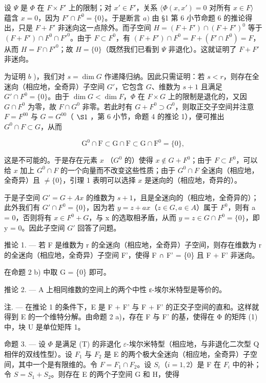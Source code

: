 设 \(\Psi\) 是 \(\Phi\) 在 \(F \times F'\) 上的限制；对 \(x' \in F'\)，关系 \(\langle \Phi(x, x') = 0\) 对所有 \(x \in F\rangle\) 蕴含 \(x = 0\)，因为 \(F' \cap F^0 = \{0\}\)。于是断言 \(a)\) 由 §1 第 6 小节命题 6 的推论得出，只是 \(F + F'\) 非迷向这一点除外。而子空间 \(H = (F + F') \cap (F + F')^0\) 等于 \((F + F') \cap F^0 \cap F'^0\)。由于 \(F \subset F^0\)，有 \((F + F') \cap F^0 = F + (F' \cap F^0) = F\)，从而 \(H = F \cap F'^0\)；故 \(H = \{0\}\)（既然我们已看到 \(\Psi\) 非退化）。这就证明了 \(F + F'\) 非迷向。

为证明 \(b\) )，我们对 \(s = \dim G\) 作递降归纳。因此只需证明：若 \(s < r\)，则存在全迷向（相应地，全奇异）子空间 \(G'\)，它包含 \(G\)、维数为 \(s + 1\) 且满足 \(G' \cap F^0 = \{0\}\)。由于 \(\dim G < \dim F\)，\(\Phi\) 在 \(F \times G\) 上的限制是退化的，又因 \(G \cap F^0\) 为零，故 \(F \cap G^0\) 非零。若此时有 \(G + F^0 \supset G^0\)，则取正交子空间并注意 \(F = F^{00}\) 与 \(G = G^{00}\)（ \(\S 1\) ，第 6 小节，命题 4 的推论 1），便可推出 \(G^0 \cap F \subset G\)，从而

\[
\mathrm{G} ^ {0} \cap \mathrm{F} \subset \mathrm{G} \cap \mathrm{F} \subset \mathrm{G} \cap \mathrm{F} ^ {0} = \{0 \},
\]

这是不可能的。于是存在元素 \(x\) （\(G^0\) 的）使得 \(x \notin G + F^0\)；由于 \(F \subset F^0\)，可以给 \(x\) 加上 \(G^0 \cap F\) 的一个向量而不改变这些性质；由于 \(G^0 \cap F\) 全迷向（相应地，全奇异）且 \(\neq \{0\}\)，引理 1 表明可以选择 \(x\) 是迷向的（相应地，奇异的）。

于是子空间 \(G' = G + Ax\) 的维数为 \(s + 1\)，且是全迷向的（相应地，全奇异的）；此外我们有 \(G' \cap F^{0} = \{0\}\)，因为若 \(y = z + ax\)（\(z \in G, a \in A\)）属于 \(F^{0}\)，则有 a = 0，否则将有 \(x \in F^{0} + G\)，与 x 的选取相矛盾，从而 \(y = z \in G \cap F^{0} = \{0\}\)，即 y = 0。因此子空间 \(G'\) 回答了问题。

推论 1. --- 若 F 是维数为 r 的全迷向（相应地，全奇异）子空间，则存在维数为 r 的全迷向（相应地，全奇异）子空间 F'，使得 F ∩ F' = \{0\} 且 F + F' 非迷向。

在命题 2 b) 中取 G = \{0\} 即可。

推论 2. --- A 上相同维数的空间上的两个中性 ε-埃尔米特型是等价的。

注. --- 在推论 1 的条件下，E 是 F + F' 与 F + F' 的正交子空间的直和。这样就得到 E 的一个维特分解。由命题 2 a)，存在 F 与 F' 的基，使得在 Φ 的矩阵 (1) 中，块 U 是单位矩阵 1。

命题 3. --- 设 \(\Phi\) 是满足 (T) 的非退化 \(\varepsilon\)-埃尔米特型（相应地，与非退化二次型 Q 相伴的双线性型）。设 \(F_{1}\) 与 \(F_{2}\) 是 E 的两个极大全迷向（相应地，全奇异）子空间，其中一个是有限维的。令 \(F = F_{1} \cap F_{2}\)。设 \(S_{i}\)（\(i = 1, 2\)）是 F 在 \(F_{i}\) 中的补；令 \(S = S_{1} + S_{2}\)。则存在 E 的两个子空间 G 和 H，使得

